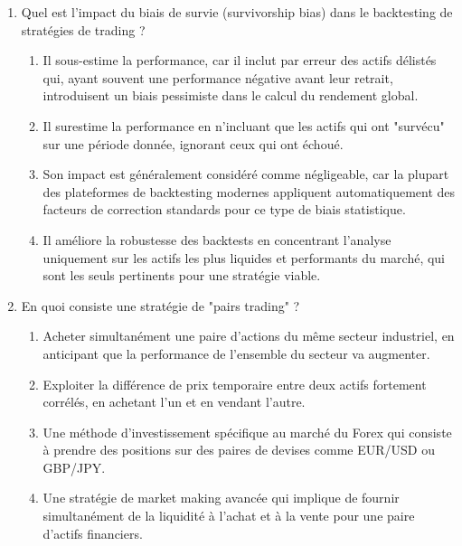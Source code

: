 \documentclass[a4paper,12pt]{article}
\begin{document}
\begin{enumerate}
    \item Quel est l'impact du biais de survie (survivorship bias) dans le backtesting de stratégies de trading ?
    \begin{enumerate}[label=(\Alph*)]
        \item Il sous-estime la performance, car il inclut par erreur des actifs délistés qui, ayant souvent une performance négative avant leur retrait, introduisent un biais pessimiste dans le calcul du rendement global.
        \item Il surestime la performance en n'incluant que les actifs qui ont "survécu" sur une période donnée, ignorant ceux qui ont échoué.
        \item Son impact est généralement considéré comme négligeable, car la plupart des plateformes de backtesting modernes appliquent automatiquement des facteurs de correction standards pour ce type de biais statistique.
        \item Il améliore la robustesse des backtests en concentrant l'analyse uniquement sur les actifs les plus liquides et performants du marché, qui sont les seuls pertinents pour une stratégie viable.
    \end{enumerate}

    \item En quoi consiste une stratégie de "pairs trading" ?
    \begin{enumerate}[label=(\Alph*)]
        \item Acheter simultanément une paire d'actions du même secteur industriel, en anticipant que la performance de l'ensemble du secteur va augmenter.
        \item Exploiter la différence de prix temporaire entre deux actifs fortement corrélés, en achetant l'un et en vendant l'autre.
        \item Une méthode d'investissement spécifique au marché du Forex qui consiste à prendre des positions sur des paires de devises comme EUR/USD ou GBP/JPY.
        \item Une stratégie de market making avancée qui implique de fournir simultanément de la liquidité à l'achat et à la vente pour une paire d'actifs financiers.
    \end{enumerate}
    

\end{enumerate}
\end{document}
